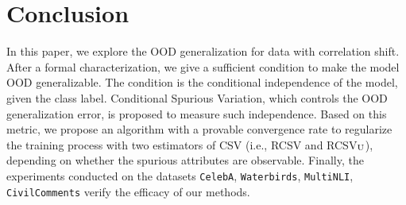 \documentclass{article} %
\begin{document}
	\section{Conclusion}
	In this paper, we explore the OOD generalization for data with correlation shift. After a formal characterization, we give a sufficient condition to make the model OOD generalizable. The condition is the conditional independence of the model, given the class label. Conditional Spurious Variation, which controls the OOD generalization error, is proposed to measure such independence. Based on this metric, we propose an algorithm with a provable convergence rate to regularize the training process with two estimators of CSV (i.e., RCSV and RCSV$_{\rm U}$), depending on whether the spurious attributes are observable. Finally, the experiments conducted on the datasets \texttt{CelebA}, \texttt{Waterbirds}, \texttt{MultiNLI}, \texttt{CivilComments} verify the efficacy of our methods. %
	
	
	\newpage
	
	
	\newpage
	
	
	\appendix
	
	\clearpage
\end{document}

